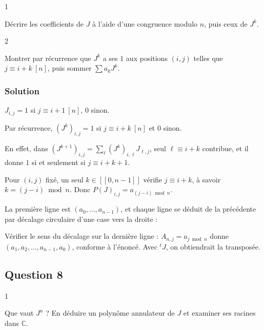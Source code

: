 \documentclass[11pt,a4paper]{article}
\newcommand{\equationajustee}[1]{%
  \sbox{\boiteequation}{$\displaystyle #1$}%
  \ifdim\wd\boiteequation>\linewidth
    \[\resizebox{\linewidth}{!}{\usebox{\boiteequation}}\]%
  \else
    \[#1\]%
  \fi}
\begin{document}
\begin{indication}{1}

Décrire les coefficients de \(J\) à l'aide d'une congruence modulo \(n\), puis ceux de \(J^k\).

\end{indication}

\begin{indication}{2}

Montrer par récurrence que \(J^k\) a ses \(1\) aux positions \((i,j)\) telles que \(j\equiv i+k\ [n]\), puis sommer \(\sum a_kJ^k\).

\end{indication}

\hypertarget{solution-6}{%
\subsubsection{Solution}\label{solution-6}}

\(J_{i,j}=1\) si \(j\equiv i+1\ [n]\), \(0\) sinon.

Par récurrence, \((J^k)_{i,j}=1\) si \(j\equiv i+k\ [n]\) et \(0\) sinon.

En effet, dans \((J^{k+1})_{i,j}=\sum_\ell(J^k)_{i,\ell}J_{\ell,j}\), seul \(\ell\equiv i+k\) contribue, et il donne \(1\) si et seulement si \(j\equiv i+k+1\).

Pour \((i,j)\) fixé, un seul \(k\in[\![0,n-1]\!]\) vérifie \(j\equiv i+k\), à savoir \(k=(j-i)\bmod n\). Donc \(P(J)_{i,j}=a_{(j-i)\bmod n}\).

La première ligne est \((a_0,\dots,a_{n-1})\), et chaque ligne se déduit de la précédente par décalage circulaire d'une case vers la droite :
\equationajustee{\boxed{A=P(J)}}

\begin{piege}

Vérifier le sens du décalage sur la dernière ligne : \(A_{n,j}=a_{j\bmod n}\) donne \((a_1,a_2,\dots,a_{n-1},a_0)\), conforme à l'énoncé. Avec \({}^tJ\), on obtiendrait la transposée.

\end{piege}

\hypertarget{question-8}{%
\subsection{Question 8}\label{question-8}}

\begin{indication}{1}

Que vaut \(J^n\) ? En déduire un polynôme annulateur de \(J\) et examiner ses racines dans \(\mathbb C\).

\end{indication}
\end{document}
